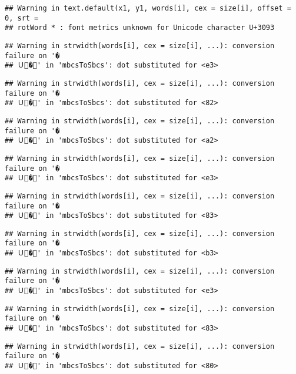 \documentclass[]{article}
\begin{document}
\begin{verbatim}
## Warning in text.default(x1, y1, words[i], cex = size[i], offset = 0, srt =
## rotWord * : font metrics unknown for Unicode character U+3093
\end{verbatim}

\begin{verbatim}
## Warning in strwidth(words[i], cex = size[i], ...): conversion failure on '�
## Ｕ�' in 'mbcsToSbcs': dot substituted for <e3>
\end{verbatim}

\begin{verbatim}
## Warning in strwidth(words[i], cex = size[i], ...): conversion failure on '�
## Ｕ�' in 'mbcsToSbcs': dot substituted for <82>
\end{verbatim}

\begin{verbatim}
## Warning in strwidth(words[i], cex = size[i], ...): conversion failure on '�
## Ｕ�' in 'mbcsToSbcs': dot substituted for <a2>
\end{verbatim}

\begin{verbatim}
## Warning in strwidth(words[i], cex = size[i], ...): conversion failure on '�
## Ｕ�' in 'mbcsToSbcs': dot substituted for <e3>
\end{verbatim}

\begin{verbatim}
## Warning in strwidth(words[i], cex = size[i], ...): conversion failure on '�
## Ｕ�' in 'mbcsToSbcs': dot substituted for <83>
\end{verbatim}

\begin{verbatim}
## Warning in strwidth(words[i], cex = size[i], ...): conversion failure on '�
## Ｕ�' in 'mbcsToSbcs': dot substituted for <b3>
\end{verbatim}

\begin{verbatim}
## Warning in strwidth(words[i], cex = size[i], ...): conversion failure on '�
## Ｕ�' in 'mbcsToSbcs': dot substituted for <e3>
\end{verbatim}

\begin{verbatim}
## Warning in strwidth(words[i], cex = size[i], ...): conversion failure on '�
## Ｕ�' in 'mbcsToSbcs': dot substituted for <83>
\end{verbatim}

\begin{verbatim}
## Warning in strwidth(words[i], cex = size[i], ...): conversion failure on '�
## Ｕ�' in 'mbcsToSbcs': dot substituted for <80>
\end{verbatim}
\end{document}
